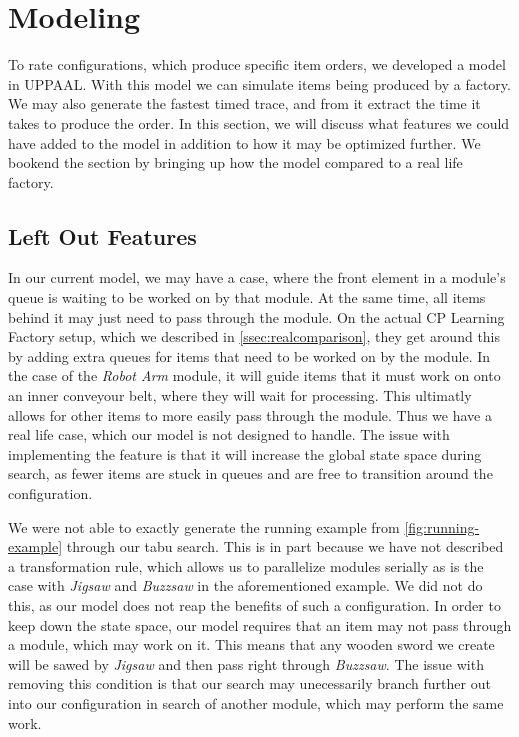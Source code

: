 \section{Modeling}\label{sec:modeling}
To rate configurations, which produce specific item orders, we developed a model in UPPAAL. With this model we can simulate items being produced by a factory. We may also generate the fastest timed trace, and from it extract the time it takes to produce the order. In this section, we will discuss what features we could have added to the model in addition to how it may be optimized further. We bookend the section by bringing up how the model compared to a real life factory. 

\subsection{Left Out Features}\label{ssec:LOFeatures}
In our current model, we may have a case, where the front element in a module's queue is waiting to be worked on by that module. At the same time, all items behind it may just need to pass through the module. On the actual CP Learning Factory setup, which we described in \cref{ssec:realcomparison}, they get around this by adding extra queues for items that need to be worked on by the module. In the case of the \textit{Robot Arm} module, it will guide items that it must work on onto an inner conveyour belt, where they will wait for processing. This ultimatly allows for other items to more easily pass through the module. Thus we have a real life case, which our model is not designed to handle. The issue with implementing the feature is that it will increase the global state space during search, as fewer items are stuck in queues and are free to transition around the configuration. 

We were not able to exactly generate the running example from \cref{fig:running-example} through our tabu search. This is in part because we have not described a transformation rule, which allows us to parallelize modules serially as is the case with \textit{Jigsaw} and \textit{Buzzsaw} in the aforementioned example. We did not do this, as our model does not reap the benefits of such a configuration. In order to keep down the state space, our model requires that an item may not pass through a module, which may work on it. This means that any wooden sword we create will be sawed by \textit{Jigsaw} and then pass right through \textit{Buzzsaw}. The issue with removing this condition is that our search may unecessarily branch further out into our configuration in search of another module, which may perform the same work.

